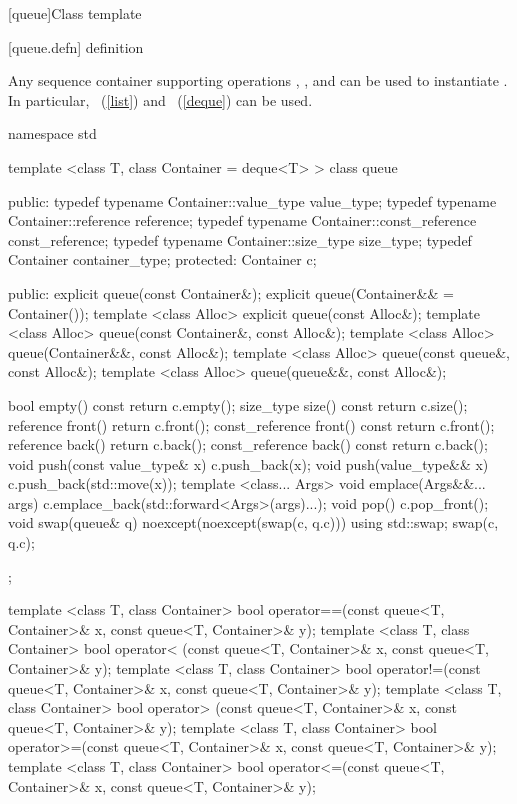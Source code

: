 [queue]{Class template }

[queue.defn]{ definition}

\pnum
{}%
Any sequence container supporting operations
,
,
and
can be used to instantiate
.
In particular,
~(\ref{list})
and
~(\ref{deque})
can be used.

\begin{codeblock}
namespace std {
  template <class T, class Container = deque<T> >
  class queue {
  public:
    typedef typename Container::value_type            value_type;
    typedef typename Container::reference             reference;
    typedef typename Container::const_reference       const_reference;
    typedef typename Container::size_type             size_type;
    typedef          Container                        container_type;
  protected:
    Container c;

  public:
    explicit queue(const Container&);
    explicit queue(Container&& = Container());
    template <class Alloc> explicit queue(const Alloc&);
    template <class Alloc> queue(const Container&, const Alloc&);
    template <class Alloc> queue(Container&&, const Alloc&);
    template <class Alloc> queue(const queue&, const Alloc&);
    template <class Alloc> queue(queue&&, const Alloc&);

    bool              empty() const     { return c.empty(); }
    size_type         size()  const     { return c.size(); }
    reference         front()           { return c.front(); }
    const_reference   front() const     { return c.front(); }
    reference         back()            { return c.back(); }
    const_reference   back() const      { return c.back(); }
    void push(const value_type& x)      { c.push_back(x); }
    void push(value_type&& x)           { c.push_back(std::move(x)); }
    template <class... Args> void emplace(Args&&... args)
      { c.emplace_back(std::forward<Args>(args)...); }
    void pop()                          { c.pop_front(); }
    void swap(queue& q) noexcept(noexcept(swap(c, q.c)))
      { using std::swap; swap(c, q.c); }
  };

  template <class T, class Container>
    bool operator==(const queue<T, Container>& x, const queue<T, Container>& y);
  template <class T, class Container>
    bool operator< (const queue<T, Container>& x, const queue<T, Container>& y);
  template <class T, class Container>
    bool operator!=(const queue<T, Container>& x, const queue<T, Container>& y);
  template <class T, class Container>
    bool operator> (const queue<T, Container>& x, const queue<T, Container>& y);
  template <class T, class Container>
    bool operator>=(const queue<T, Container>& x, const queue<T, Container>& y);
  template <class T, class Container>
    bool operator<=(const queue<T, Container>& x, const queue<T, Container>& y);

}
\end{codeblock}
